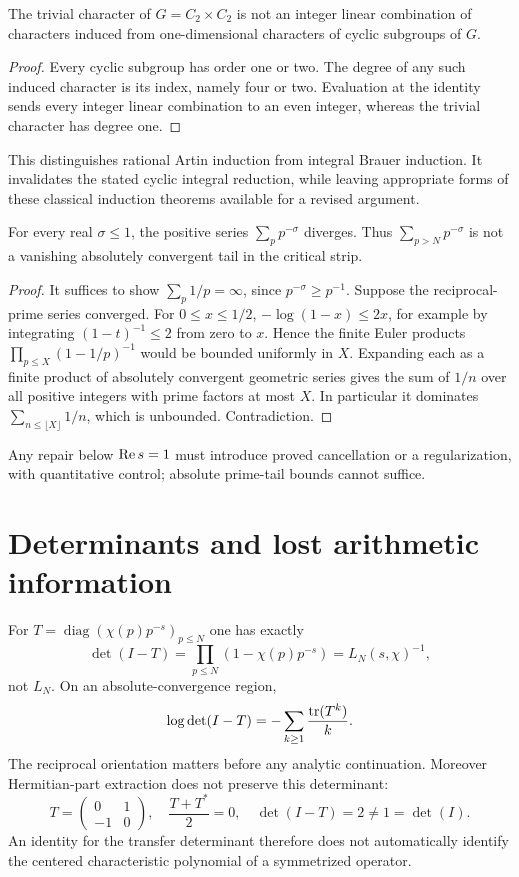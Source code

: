 \begin{theorem}\label{thm:cyclic}
The trivial character of $G=C_2\times C_2$ is not an integer linear
combination of characters induced from one-dimensional characters of
cyclic subgroups of $G$.
\end{theorem}
\begin{proof}
Every cyclic subgroup has order one or two. The degree of any such
induced character is its index, namely four or two. Evaluation at the
identity sends every integer linear combination to an even integer,
whereas the trivial character has degree one.
\end{proof}
This distinguishes rational Artin induction from integral Brauer induction.
It invalidates the stated cyclic integral reduction, while leaving appropriate
forms of these classical induction theorems available for a revised argument.

\begin{theorem}\label{thm:tail}
For every real $\sigma\le1$, the positive series
$\sum_p p^{-\sigma}$ diverges. Thus
$\sum_{p>N}p^{-\sigma}$ is not a vanishing absolutely convergent tail
in the critical strip.
\end{theorem}
\begin{proof}
It suffices to show $\sum_p1/p=\infty$, since $p^{-\sigma}\ge p^{-1}$.
Suppose the reciprocal-prime series converged. For $0\le x\le1/2$,
$-\log(1-x)\le2x$, for example by integrating
$(1-t)^{-1}\le2$ from zero to $x$. Hence the finite Euler products
$\prod_{p\le X}(1-1/p)^{-1}$ would be bounded uniformly in $X$.
Expanding each as a finite product of absolutely convergent geometric
series gives the sum of $1/n$ over all positive integers with prime
factors at most $X$. In particular it dominates
$\sum_{n\le\lfloor X\rfloor}1/n$, which is unbounded. Contradiction.
\end{proof}
Any repair below $\operatorname{Re} s=1$ must introduce proved cancellation or a
regularization, with quantitative control; absolute prime-tail bounds cannot suffice.

\section{Determinants and lost arithmetic information}
For $T=\operatorname{diag}(\chi(p)p^{-s})_{p\le N}$ one has exactly
\[
 \det(I-T)=\prod_{p\le N}(1-\chi(p)p^{-s})=L_N(s,\chi)^{-1},
\]
not $L_N$. On an absolute-convergence region,
\[
 \log\det(I-T)=-\sum_{k\ge1}\frac{\operatorname{tr}(T^k)}k.
\]
The reciprocal orientation matters before any analytic continuation.
Moreover Hermitian-part extraction does not preserve this determinant:
\[
 T=\begin{pmatrix}0&1\\-1&0\end{pmatrix},\quad
 \frac{T+T^*}2=0,\quad \det(I-T)=2\ne1=\det(I).
\]
An identity for the transfer determinant therefore does not automatically
identify the centered characteristic polynomial of a symmetrized operator.

